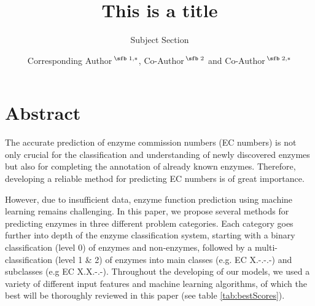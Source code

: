 \documentclass{bioinfo}
\begin{document}

\subtitle{Subject Section}

\title[References]{This is a title}
\author[]{Corresponding Author\,$^{\text{\sfb 1,}*}$, Co-Author\,$^{\text{\sfb 2}}$ and Co-Author\,$^{\text{\sfb 2,}*}$}
\address{$^{\text{\sf 1}}$Department, Institution, City, Post Code, Country and \\
$^{\text{\sf 2}}$Department, Institution, City, Post Code,
Country.}





\maketitle

\section{Abstract}
The accurate prediction of enzyme commission numbers (EC numbers) is not only crucial for 
the classification and understanding of newly discovered enzymes but also for completing the annotation of already known enzymes.
Therefore, developing a reliable method for predicting EC numbers is of great importance.

However, due to insufficient data, enzyme function prediction using machine learning remains challenging.
In this paper, we propose several methods for predicting enzymes in three different problem categories. Each category goes further into depth
of the enzyme classification system, starting with a binary classification (level 0) of enzymes and non-enzymes, followed by a multi-classification (level 1 \& 2) of enzymes into main classes (e.g. EC X.-.-.-) and subclasses (e.g EC X.X.-.-).
Throughout the developing of our models, we used a variety of different input features and machine learning algorithms, of which the best will be thoroughly reviewed in this paper (see table \ref{tab:bestScores}).
\end{document}
